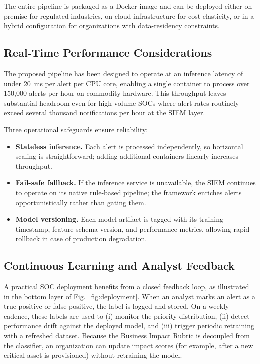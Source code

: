 \documentclass[conference]{IEEEtran}
\begin{document}
The entire pipeline is packaged as a Docker image and can be deployed 
either on-premise for regulated industries, on cloud infrastructure 
for cost elasticity, or in a hybrid configuration for organizations 
with data-residency constraints.

\subsection{Real-Time Performance Considerations}

The proposed pipeline has been designed to operate at an inference 
latency of under 20~ms per alert per CPU core, enabling a single 
container to process over 150{,}000 alerts per hour on commodity 
hardware. This throughput leaves substantial headroom even for 
high-volume SOCs where alert rates routinely exceed several thousand 
notifications per hour at the SIEM layer.

Three operational safeguards ensure reliability:

\begin{itemize}
    \item \textbf{Stateless inference.} Each alert is processed 
    independently, so horizontal scaling is straightforward; adding 
    additional containers linearly increases throughput.
    
    \item \textbf{Fail-safe fallback.} If the inference service is 
    unavailable, the SIEM continues to operate on its native 
    rule-based pipeline; the framework enriches alerts opportunistically 
    rather than gating them.
    
    \item \textbf{Model versioning.} Each model artifact is tagged 
    with its training timestamp, feature schema version, and 
    performance metrics, allowing rapid rollback in case of 
    production degradation.
\end{itemize}

\subsection{Continuous Learning and Analyst Feedback}

A practical SOC deployment benefits from a closed feedback loop, as 
illustrated in the bottom layer of Fig.~\ref{fig:deployment}. When an 
analyst marks an alert as a true positive or false positive, the label 
is logged and stored. On a weekly cadence, these labels are used to 
(i) monitor the priority distribution, (ii) detect performance drift 
against the deployed model, and (iii) trigger periodic retraining with 
a refreshed dataset. Because the Business Impact Rubric is decoupled 
from the classifier, an organization can update impact scores (for 
example, after a new critical asset is provisioned) without retraining 
the model.
\end{document}
